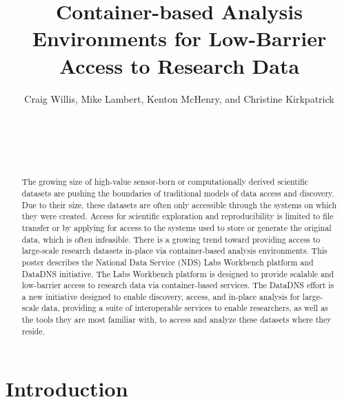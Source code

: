 \documentclass{sig-alternate}
\begin{document}
\sloppy
{}

\author{
Craig Willis, Mike Lambert, Kenton McHenry, and Christine Kirkpatrick\\
     \\
     \\     
     \\
     \\     
}

\title{Container-based Analysis Environments for Low-Barrier Access to Research Data}

\maketitle
\begin{abstract}

The growing size of high-value sensor-born or computationally derived scientific datasets are pushing the boundaries of traditional models of data access and discovery. Due to their size, these datasets are often only accessible through the systems on which they were created. Access for scientific exploration and reproducibility is limited to file transfer or by applying for access to the systems used to store or generate the original data, which is often infeasible. There is a growing trend toward providing access to large-scale research datasets in-place via container-based analysis environments. This poster describes the National Data Service (NDS) Labs Workbench platform and DataDNS initiative. The Labs Workbench platform is designed to provide scalable and low-barrier access to research data via container-based services. The DataDNS effort is a new initiative designed to enable discovery, access, and in-place analysis for large-scale data, providing a suite of interoperable services to enable researchers, as well as the tools they are most familiar with, to access and analyze these datasets where they reside.

\end{abstract}


\keywords{}

\section{Introduction}
\end{document}
